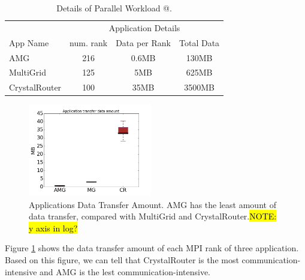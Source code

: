 \documentclass[conference,compsoc]{IEEEtran}
\makeatletter
\newcommand{\NOTE}[1]{\hl {NOTE: #1}}
\newcommand{\Rmnum}[1]{\expandafter\@slowromancap\romannumeral #1@}
\makeatother
\begin{document}
\begin{table}[ht]
\begin{center}
\caption{Details of Parallel Workload \Rmnum{1 }.} 
\label{tab: parallel workload-1}
\begin{tabular}{l c c c }
\toprule %
\toprule
&\multicolumn{3}{c}{Application Details} \\ %
\cmidrule(l){2-4}
App Name & num. rank & Data per Rank & Total Data\\ %
\midrule %
AMG  &    216 &   0.6MB   &     130MB\\ %
\midrule
MultiGrid  &    125 &   5MB   &     625MB\\ 
\midrule
CrystalRouter  &   100  &  35MB    &     3500MB\\ 

\midrule %
\bottomrule %
\end{tabular}
\end{center}
\end{table}


\begin{figure}[h!]
  \centering
  \includegraphics[width = 0.48\textwidth ]{data_amount}
  \caption{Applications Data Transfer Amount. AMG has the least amount of data transfer, compared with MultiGrid and CrystalRouter.\NOTE{y axis in log?} }
  \label{fig:3app-data-amount}
\end{figure}

Figure \ref{fig:3app-data-amount} shows the data transfer amount of each MPI rank of three application. Based on this figure, we can tell that CrystalRouter is the most communication-intensive and AMG is the lest communication-intensive. 
\end{document}
